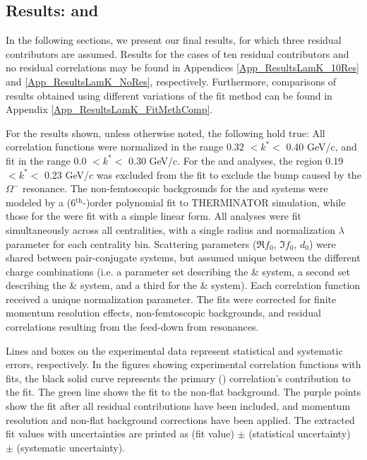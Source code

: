 \documentclass[/home/jesse/Analysis/FemtoAnalysis/AnalysisNotes/AnalysisNoteJBuxton.tex]{subfiles}
\begin{document}
\subsection{Results: \LamKs and \LamKpm}
\label{ResultsLamK}

In the following sections, we present our final results, for which three residual contributors are assumed.
Results for the cases of ten residual contributors and no residual correlations may be found in Appendices \ref{App_ResultsLamK_10Res} and \ref{App_ResultsLamK_NoRes}, respectively.
Furthermore, comparisons of results obtained using different variations of the fit method can be found in Appendix \ref{App_ResultsLamK_FitMethComp}.

For the results shown, unless otherwise noted, the following hold true:
All correlation functions were normalized in the range 0.32 $< k^{*} <$ 0.40 GeV/c, and fit in the range 0.0 $< k^{*} <$ 0.30 GeV/c.
For the \LamKchM and \ALamKchP analyses, the region 0.19 $< k^{*} <$ 0.23 GeV/$c$ was excluded from the fit to exclude the bump caused by the $\Omega^{-}$ resonance.
The non-femtoscopic backgrounds for the \LamKchP and \LamKchM systems were modeled by a (6$^{\mathrm{th}}$-)order polynomial fit to THERMINATOR simulation, while those for the \LamKs were fit with a simple linear form.
All analyses were fit simultaneously across all centralities, with a single radius and normalization $\lambda$ parameter for each centrality bin.
Scattering parameters ($\Re f_{0}$, $\Im f_{0}$, $d_{0}$) were shared between pair-conjugate systems, but assumed unique between the different \LamK charge combinations (i.e. a parameter set describing the \LamKchP \& \ALamKchM system, a second set describing the \LamKchM \& \ALamKchP system, and a third for the \LamKs \& \ALamKs system).
Each correlation function received a unique normalization parameter.
The fits were corrected for finite momentum resolution effects, non-femtoscopic backgrounds, and residual correlations resulting from the feed-down from resonances.

Lines and boxes on the experimental data represent statistical and systematic errors, respectively.
In the figures showing experimental correlation functions with fits, the black solid curve represents the primary (\LamK) correlation's contribution to the fit.
The green line shows the fit to the non-flat background.  
The purple points show the fit after all residual contributions have been included, and momentum resolution and non-flat background corrections have been applied.
The extracted fit values with uncertainties are printed as (fit value) $\pm$ (statistical uncertainty) $\pm$ (systematic uncertainty).
\end{document}
